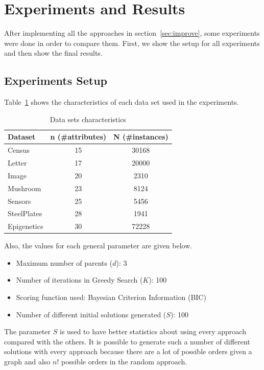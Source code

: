 \section{Experiments and Results}
\label{sec:experiments}

After implementing all the approaches in section~\ref{sec:improve}, some experiments were done in order to compare them. First, we show the setup for all experiments and then show the final results.

\subsection{Experiments Setup}
\label{subsec:configuration}
	Table~\ref{tab:datasets} shows the characteristics of each data set used in the experiments.
	\begin{table}[ h ]
		\centering
		\begin{tabular}{ | l | c | c | }
			\hline
			Dataset & n (\#attributes) & N (\#instances) \\ \hline
			Census & 15 & 30168 \\ \hline
			Letter & 17 & 20000 \\ \hline
			Image & 20 & 2310 \\ \hline
			Mushroom & 23 & 8124 \\ \hline
			Sensors & 25 & 5456 \\ \hline
			SteelPlates & 28 & 1941 \\ \hline
			Epigenetics & 30 & 72228 \\ \hline
		\end{tabular}
		\caption{Data sets characteristics}
		\label{tab:datasets}
	\end{table}
	Also, the values for each general parameter are given below.
	\begin{itemize}
		\item Maximum number of parents ($d$): 3
		\item Number of iterations in Greedy Search ($K$): 100
		\item Scoring function used: Bayesian Criterion Information (BIC)
		\item Number of different initial solutions generated ($S$): 100
	\end{itemize}
	The parameter $S$ is used to have better statistics about using every approach compared with the others. It is possible to generate such a number of different solutions with every approach because there are a lot of possible orders given a graph and also $n!$ possible orders in the random approach.

